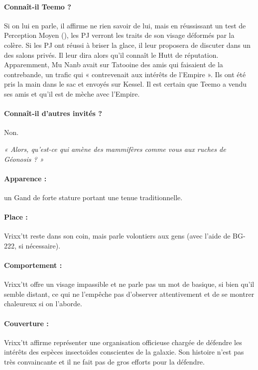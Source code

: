 \documentclass[a4paper,10pt,twoside,twocolumn,openany]{book}
\begin{document}
\paragraph{Connaît-il Teemo ?} Si on lui en parle, il affirme ne
rien savoir de lui, mais en réussissant un test de Perception Moyen (\difficulty \difficulty), les PJ verront les traits de son
visage déformés par la colère. Si les PJ ont réussi à
briser la glace, il leur proposera de discuter dans un
des salons privés. Il leur dira alors qu’il connaît le Hutt
de réputation. Apparemment, Mu Nanb avait sur Tatooine des amis qui faisaient de la contrebande, un
trafic qui « contrevenait aux intérêts de l’Empire ». Ils
ont été pris la main dans le sac et envoyés sur Kessel.
Il est certain que Teemo a vendu ses amis et qu’il est
de mèche avec l’Empire.

\paragraph{Connaît-il d’autres invités ?} Non.

\subtitle{VRIXX’TT}

\emph{« Alors, qu’est-ce qui amène des mammifères comme
vous aux ruches de Géonosis ? »}

\paragraph{Apparence :} un Gand de forte stature portant
une tenue traditionnelle.
\paragraph{Place :} Vrixx’tt reste dans son coin,
mais parle volontiers aux gens (avec
l’aide de BG-222, si nécessaire).
\paragraph{Comportement :} Vrixx’tt offre un visage
impassible et ne parle pas un mot de basique, si
bien qu’il semble distant, ce qui ne l’empêche
pas d’observer attentivement et de se montrer
chaleureux si on l’aborde.
\paragraph{Couverture :} Vrixx’tt affirme représenter une organisation officieuse chargée de défendre les intérêts des espèces insectoïdes conscientes de la galaxie. Son histoire
n’est pas très convaincante et il ne fait pas de gros efforts
pour la défendre.
\end{document}
